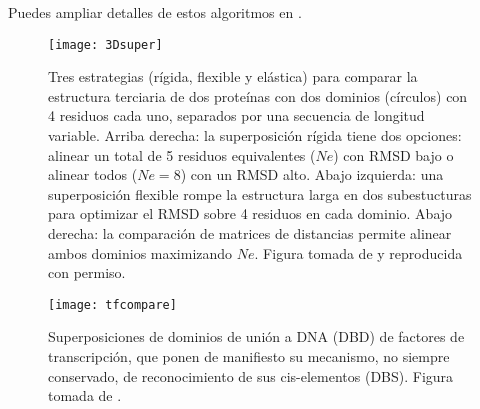 Puedes ampliar detalles de estos algoritmos en \citet{pascual_garcia_alberto_2014_1066346}.


\begin{figure}
\begin{center} 
\texttt{[image: 3Dsuper]}
\caption%
{
Tres estrategias (r\'{i}gida, flexible y el\'{a}stica) para comparar la estructura terciaria de dos prote\'{i}nas 
con dos dominios (c\'{i}rculos) con 4 residuos cada uno, separados por una secuencia de longitud variable.
Arriba derecha: la superposici\'{o}n r\'{i}gida tiene dos opciones: alinear un total de 5 residuos equivalentes ($Ne$) con RMSD bajo 
o alinear todos ($Ne=8$) con un RMSD alto. 
Abajo izquierda: una superposici\'{o}n flexible rompe la estructura larga en dos subestucturas para optimizar el RMSD sobre 4 residuos en cada dominio.
Abajo derecha: la comparaci\'{o}n de matrices de distancias permite alinear ambos dominios maximizando $Ne$.
Figura tomada de \citet{Hasegawa2009} y reproducida con permiso.
}
\label{fig:dali}
\end{center}
\end{figure}


\begin{figure}
\begin{center} 
\texttt{[image: tfcompare]}
\caption%
{
Superposiciones de dominios de uni\'{o}n a DNA (DBD) de factores de transcripci\'{o}n, que ponen de manifiesto 
su mecanismo, no siempre conservado, de reconocimiento de sus cis-elementos (DBS). 
Figura tomada de \citet{Sebastian2013}.
}
\label{fig:tfcompare}
\end{center}
\end{figure}

